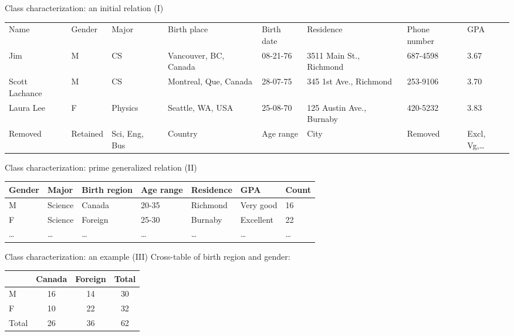 \documentclass[aspectratio=169,t]{beamer}
\begin{document}
  { 
    \begin{frame}{Class characterization: an initial relation (I)}
    \begin{table}
    \small
    \begin{tabularx}{\textwidth}{|X|X|X|X|X|X|X|X|}
    \hline
    Name & Gender & Major & Birth place & Birth date & Residence & Phone number & GPA \\
    Jim & M & CS & Vancouver, BC, Canada & 08-21-76 & 3511 Main St., Richmond & 687-4598 & 3.67 \\\hline
    Scott Lachance & M & CS & Montreal, Que, Canada & 28-07-75 & 345 1st Ave., Richmond & 253-9106 & 3.70 \\\hline
    Laura Lee & F & Physics & Seattle, WA, USA & 25-08-70 & 125 Austin Ave., Burnaby & 420-5232 & 3.83 \\\hline
    {\color{red}Removed} & {\color{red}Retained} & {\color{red}Sci, Eng, Bus} & {\color{red}Country} & {\color{red}Age range} & {\color{red}City} & {\color{red}Removed} & {\color{red}Excl, Vg,\ldots} \\\hline
    \end{tabularx}
    \end{table}
    \end{frame}
  }

  { 
    \begin{frame}{Class characterization: prime generalized relation (II)}
    \begin{table}
    \begin{tabularx}{\textwidth}{|X|X|X|X|X|X|X|}
    \hline
    Gender & Major & Birth region & Age range & Residence & GPA & Count \\\hline
    M & Science & Canada & 20-35 & Richmond & Very good & 16 \\\hline
    F & Science & Foreign & 25-30 & Burnaby & Excellent & 22 \\\hline
    \ldots & \ldots & \ldots & \ldots & \ldots & \ldots & \ldots \\
    \hline
    \end{tabularx}
    \end{table}
    \end{frame}
  }

  { 
    \begin{frame}{Class characterization: an example (III)}
    \centering
    Cross-table of birth region and gender:\\[0.5cm]
    \begin{tabular}{|l|c|c|c|}
    \hline
    & Canada & Foreign & Total \\\hline
    M & 16 & 14 & 30 \\\hline
    F & 10 & 22 & 32 \\\hline
    Total & 26 & 36 & 62 \\\hline
    \end{tabular}
    \end{frame}
  }
\end{document}

